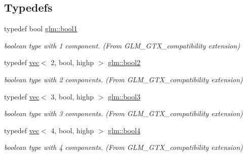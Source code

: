 \subsection*{Typedefs}
\begin{DoxyCompactItemize}
\item 
\mbox{\label{group__gtx__compatibility_gab65f19f5170f95a2f06d6aa6482c9405}} 
typedef bool \hyperlink{group__gtx__compatibility_gab65f19f5170f95a2f06d6aa6482c9405}{glm\+::bool1}
\begin{DoxyCompactList}\small\item\em boolean type with 1 component. (From G\+L\+M\+\_\+\+G\+T\+X\+\_\+compatibility extension) \end{DoxyCompactList}\item 
\mbox{\label{group__gtx__compatibility_ga19e8114c90e2c81cfa87db72f4020b52}} 
typedef \hyperlink{structglm_1_1vec}{vec}$<$ 2, bool, highp $>$ \hyperlink{group__gtx__compatibility_ga19e8114c90e2c81cfa87db72f4020b52}{glm\+::bool2}
\begin{DoxyCompactList}\small\item\em boolean type with 2 components. (From G\+L\+M\+\_\+\+G\+T\+X\+\_\+compatibility extension) \end{DoxyCompactList}\item 
\mbox{\label{group__gtx__compatibility_ga9d9411e411bc3bcb7ec64593f5e0908f}} 
typedef \hyperlink{structglm_1_1vec}{vec}$<$ 3, bool, highp $>$ \hyperlink{group__gtx__compatibility_ga9d9411e411bc3bcb7ec64593f5e0908f}{glm\+::bool3}
\begin{DoxyCompactList}\small\item\em boolean type with 3 components. (From G\+L\+M\+\_\+\+G\+T\+X\+\_\+compatibility extension) \end{DoxyCompactList}\item 
\mbox{\label{group__gtx__compatibility_ga16892e963e3aa2aa6c826a508d2df3ce}} 
typedef \hyperlink{structglm_1_1vec}{vec}$<$ 4, bool, highp $>$ \hyperlink{group__gtx__compatibility_ga16892e963e3aa2aa6c826a508d2df3ce}{glm\+::bool4}
\begin{DoxyCompactList}\small\item\em boolean type with 4 components. (From G\+L\+M\+\_\+\+G\+T\+X\+\_\+compatibility extension) \end{DoxyCompactList}\item 

\end{DoxyCompactItemize}
